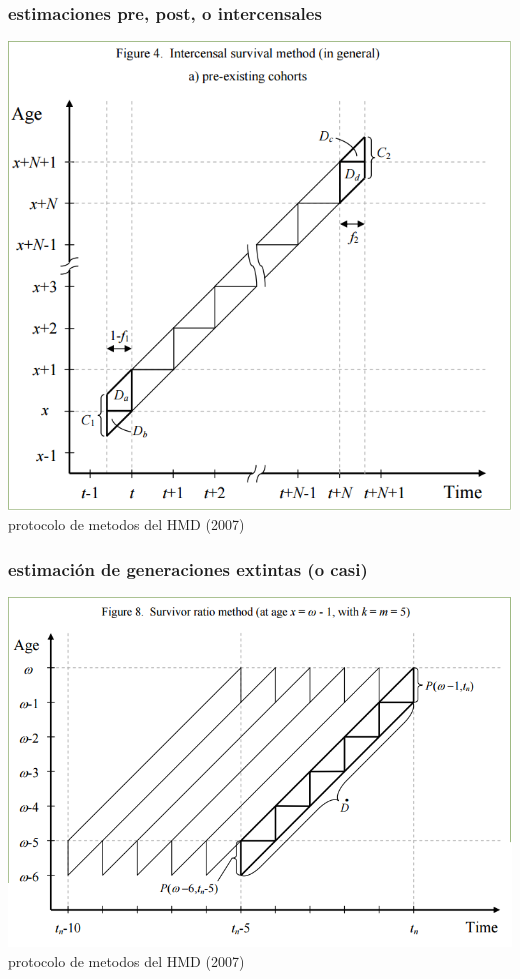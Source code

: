 \documentclass[20pt]{beamer}
\begin{document}
\begin{frame}
\frametitle{estimaciones pre, post, o intercensales}
\includegraphics[scale=.65]{Figures/HMD_MPv5Fig4.png}\\
protocolo de metodos del HMD (2007)
\end{frame}

\begin{frame}
\frametitle{estimaci\'{o}n de generaciones extintas (o casi)}
\includegraphics[scale=.7]{Figures/HMD_MPv5Fig8.png}\\
protocolo de metodos del HMD (2007)
\end{frame}
\end{document}
